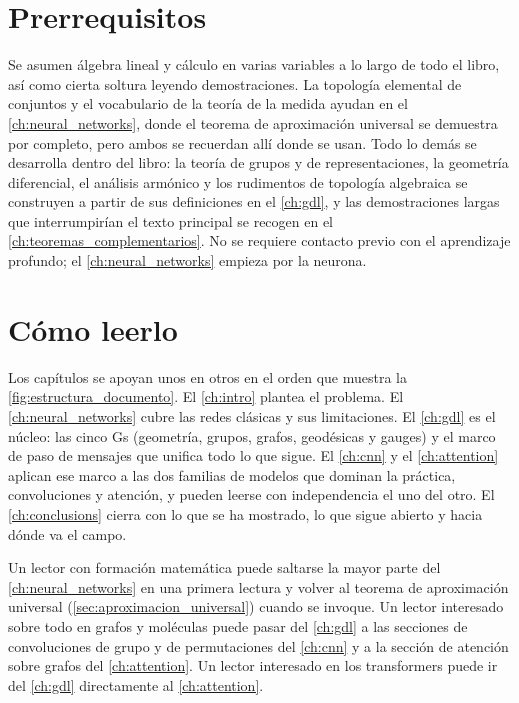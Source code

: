 \section*{Prerrequisitos}

Se asumen álgebra lineal y cálculo en varias variables a lo largo de todo el libro, así como cierta soltura leyendo demostraciones. La topología elemental de conjuntos y el vocabulario de la teoría de la medida ayudan en el \autoref{ch:neural_networks}, donde el teorema de aproximación universal se demuestra por completo, pero ambos se recuerdan allí donde se usan. Todo lo demás se desarrolla dentro del libro: la teoría de grupos y de representaciones, la geometría diferencial, el análisis armónico y los rudimentos de topología algebraica se construyen a partir de sus definiciones en el \autoref{ch:gdl}, y las demostraciones largas que interrumpirían el texto principal se recogen en el \autoref{ch:teoremas_complementarios}. No se requiere contacto previo con el aprendizaje profundo; el \autoref{ch:neural_networks} empieza por la neurona.

\section*{Cómo leerlo}

Los capítulos se apoyan unos en otros en el orden que muestra la \autoref{fig:estructura_documento}. El \autoref{ch:intro} plantea el problema. El \autoref{ch:neural_networks} cubre las redes clásicas y sus limitaciones. El \autoref{ch:gdl} es el núcleo: las cinco Gs (geometría, grupos, grafos, geodésicas y gauges) y el marco de paso de mensajes que unifica todo lo que sigue. El \autoref{ch:cnn} y el \autoref{ch:attention} aplican ese marco a las dos familias de modelos que dominan la práctica, convoluciones y atención, y pueden leerse con independencia el uno del otro. El \autoref{ch:conclusions} cierra con lo que se ha mostrado, lo que sigue abierto y hacia dónde va el campo.

Un lector con formación matemática puede saltarse la mayor parte del \autoref{ch:neural_networks} en una primera lectura y volver al teorema de aproximación universal (\autoref{sec:aproximacion_universal}) cuando se invoque. Un lector interesado sobre todo en grafos y moléculas puede pasar del \autoref{ch:gdl} a las secciones de convoluciones de grupo y de permutaciones del \autoref{ch:cnn} y a la sección de atención sobre grafos del \autoref{ch:attention}. Un lector interesado en los transformers puede ir del \autoref{ch:gdl} directamente al \autoref{ch:attention}.

